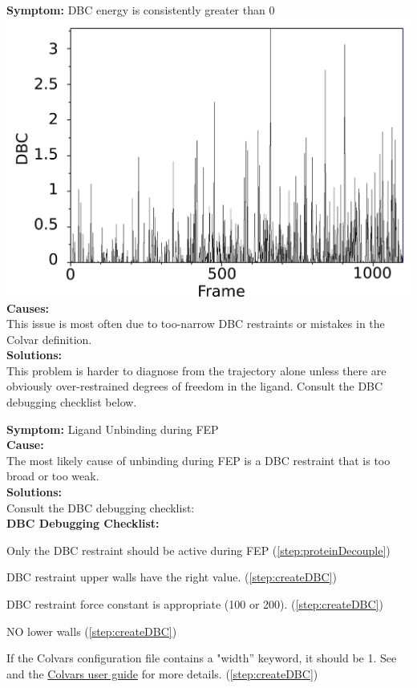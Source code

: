 \documentclass[9pt,tutorial]{Styling/livecoms}
\begin{document}
\noindent\textbf{Symptom:} DBC energy is consistently greater than 0\\
\includegraphics[width=0.9\linewidth]{tightDBC_alchsite.png}
\textbf{Causes:}\\
This issue is most often due to too-narrow DBC restraints or mistakes in the Colvar definition.\\
\textbf{Solutions:}\\
This problem is harder to diagnose from the trajectory alone unless there are obviously over-restrained degrees of freedom in the ligand. Consult the DBC debugging checklist below.

\noindent\textbf{Symptom:} Ligand Unbinding during FEP\\
\textbf{Cause:}\\
The most likely cause of unbinding during FEP is a DBC restraint that is too broad or too weak.\\
\textbf{Solutions:}\\
 Consult the DBC debugging checklist:\\

\textbf{DBC Debugging Checklist:}
\begin{todolist} \label{list:DBCdebug}
    \item Only the DBC restraint should be active during FEP (\ref{step:proteinDecouple})
    \item DBC restraint upper walls have the right value. (\ref{step:createDBC})
    \item DBC restraint force constant is appropriate (100 or 200). (\ref{step:createDBC})
    \item NO lower walls (\ref{step:createDBC})
    \item If the Colvars configuration file contains a "width'' keyword, it should be 1. See \cite{Fiorin2013} and the \href{http://colvars.github.io/colvars-refman-vmd/colvars-refman-vmd.html#sec:colvar_grid_params}{Colvars user guide} for more details. (\ref{step:createDBC})
\end{todolist}
\end{document}
